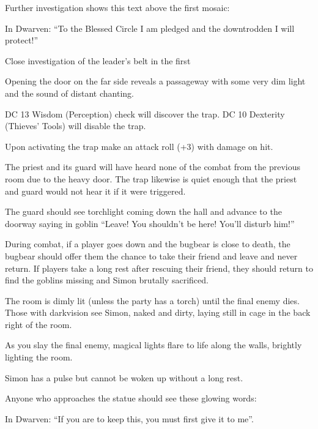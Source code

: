 \documentclass[10pt,twocolumn,openany,nodeprecatedcode,bg=none]{dndbook}
\begin{document}
Further investigation shows this text above the first mosaic:
\begin{DndReadAloud}
  In Dwarven: ``To the Blessed Circle I am pledged and the downtrodden I will protect!''
\end{DndReadAloud}

Close investigation of the leader's belt in the first 

Opening the door on the far side reveals a passageway with some very dim light and the sound of distant chanting.

DC 13 Wisdom (Perception) check will discover the trap.
DC 10 Dexterity (Thieves' Tools) will disable the trap.

Upon activating the trap make an attack roll (+3) with damage  on hit.

The priest and its guard will have heard none of the combat from the previous room due to the heavy door.
The trap likewise is quiet enough that the priest and guard would not hear it if it were triggered.

The guard should see torchlight coming down the hall and advance to the doorway saying in goblin ``Leave! You shouldn't be here! You'll disturb him!''

During combat, if a player goes down and the bugbear is close to death, the bugbear should offer them the chance to take their friend and leave and never return.
If players take a long rest after rescuing their friend, they should return to find the goblins missing and Simon brutally sacrificed.

The room is dimly lit (unless the party has a torch) until the final enemy dies.
Those with darkvision see Simon, naked and dirty, laying still in cage in the back right of the room.

\begin{DndReadAloud}
  As you slay the final enemy, magical lights flare to life along the walls, brightly lighting the room.
\end{DndReadAloud}

Simon has a pulse but cannot be woken up without a long rest.

Anyone who approaches the statue should see these glowing words:
\begin{DndReadAloud}
  In Dwarven: ``If you are to keep this, you must first give it to me''.
\end{DndReadAloud}
\end{document}
